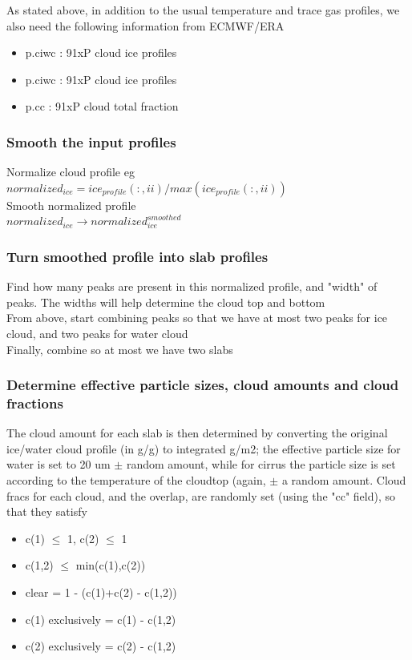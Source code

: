 \documentclass[11pt]{article}
\begin{document}
As stated above, in addition to the usual temperature and trace gas profiles, we also need the following information 
from ECMWF/ERA
\begin{itemize}
  \item p.ciwc : 91xP           cloud ice profiles
  \item p.ciwc : 91xP           cloud ice profiles
  \item p.cc   : 91xP           cloud total fraction
\end{itemize}

\subsubsection{Smooth the input profiles}
Normalize cloud profile eg \\ \hspace{1in} $normalized_{ice} = ice_{profile}(:,ii)/max(ice_{profile}(:,ii))$ \\
Smooth normalized profile  \\ \hspace{1in} $normalized_{ice} \rightarrow normalized_{ice}^{smoothed}$ \\

\subsubsection{Turn smoothed profile into slab profiles}
Find how many peaks are present in this normalized profile, and "width" of peaks. The widths will help 
determine the cloud top and bottom\\
From above, start combining peaks so that we have at most two peaks for ice cloud, and two peaks for water cloud\\
Finally, combine so at most we have two slabs\\

\subsubsection{Determine effective particle sizes, cloud amounts and cloud fractions}
The cloud amount for each slab is then determined by converting the original ice/water cloud profile (in g/g) to 
integrated g/m2; the effective particle size for water is set to 20 um $\pm$ random amount, while for cirrus
the particle size is set according to the temperature of the cloudtop (again, $\pm$ a random amount. 
Cloud fracs for each cloud, and the overlap, are randomly set (using the "cc" field), so that they satisfy 
\begin{itemize}
  \item c(1) $\le$ 1, c(2) $\le$ 1
  \item c(1,2) $\le$ min(c(1),c(2))
  \item clear = 1 - (c(1)+c(2) - c(1,2))
  \item c(1) exclusively = c(1) - c(1,2)
  \item c(2) exclusively = c(2) - c(1,2)
\end{itemize}
\end{document}
